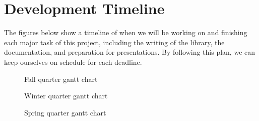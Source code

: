 \chapter{Development Timeline}

The figures below show a timeline of when we will be working on and finishing each major task of this project, including the writing of the library, the documentation, and preparation for presentations.
By following this plan, we can keep ourselves on schedule for each deadline.
\newline

\begin{figure}[!h]
\noindent\resizebox{\textwidth}{!}{
  
}
\caption{Fall quarter gantt chart}
\label{fig:gantt-fall}
\end{figure}


\begin{figure}[!h]
\noindent\resizebox{\textwidth}{!}{
  
}
\caption{Winter quarter gantt chart}
\label{fig:gantt-winter}
\end{figure}


\begin{figure}[!h]
\noindent\resizebox{\textwidth}{!}{
  
}
\caption{Spring quarter gantt chart}
\label{fig:gantt-spring}
\end{figure}
